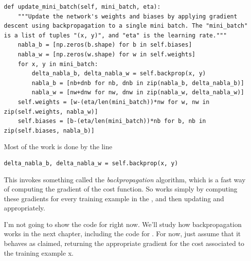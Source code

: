 \documentclass[a4paper,twoside,10pt]{book}
\begin{document}
\begin{lstlisting}
def update_mini_batch(self, mini_batch, eta):
	"""Update the network's weights and biases by applying gradient descent using backpropagation to a single mini batch. The "mini_batch" is a list of tuples "(x, y)", and "eta" is the learning rate."""
	nabla_b = [np.zeros(b.shape) for b in self.biases]
	nabla_w = [np.zeros(w.shape) for w in self.weights]
	for x, y in mini_batch:
		delta_nabla_b, delta_nabla_w = self.backprop(x, y)
		nabla_b = [nb+dnb for nb, dnb in zip(nabla_b, delta_nabla_b)]
		nabla_w = [nw+dnw for nw, dnw in zip(nabla_w, delta_nabla_w)]
	self.weights = [w-(eta/len(mini_batch))*nw for w, nw in zip(self.weights, nabla_w)]
	self.biases = [b-(eta/len(mini_batch))*nb for b, nb in zip(self.biases, nabla_b)]
\end{lstlisting}
Most of the work is done by the line
\begin{lstlisting}
delta_nabla_b, delta_nabla_w = self.backprop(x, y)
\end{lstlisting}
This invokes something called the \textit{backpropagation} algorithm, which is a fast way of computing the gradient of the cost function. So   works simply by computing these gradients for every training example in the , and then updating  and  appropriately.

I'm not going to show the code for  right now. We'll study how backpropagation works in the next chapter, including the code for . For now, just assume that it behaves as claimed, returning the appropriate gradient for the cost associated to the training example x.
\end{document}
